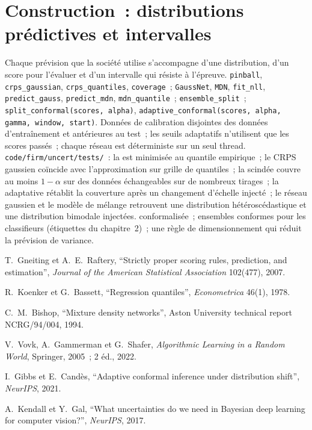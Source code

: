 \section{Construction~: distributions prédictives et intervalles}\label{bld:ml:probabilistic-models-and-uncertainty:uncert}

\begin{build}
 Chaque prévision que la société utilise s'accompagne d'une distribution, d'un score pour l'évaluer et d'un intervalle qui résiste à l'épreuve.
 \texttt{pinball}, \texttt{crps\_gaussian}, \texttt{crps\_quantiles}, \texttt{coverage}~;
\texttt{GaussNet}, \texttt{MDN}, \texttt{fit\_nll}, \texttt{predict\_gauss}, \texttt{predict\_mdn}, \texttt{mdn\_quantile}~;
\texttt{ensemble\_split}~; \texttt{split\_conformal(scores, alpha)},
\texttt{adaptive\_conformal(scores, alpha, gamma, window, start)}.
 Données de calibration disjointes des données d'entraînement et antérieures au test~; les seuils adaptatifs n'utilisent que les
scores passés~; chaque réseau est déterministe sur un seul thread.
 \texttt{code/firm/uncert/tests/}~: la  est minimisée au quantile empirique~; le
CRPS gaussien coïncide avec l'approximation sur grille de quantiles~; la  scindée couvre au moins $1 - \alpha$ sur des données échangeables
sur de nombreux tirages~; la  adaptative rétablit la couverture après un changement d'échelle injecté~; le réseau gaussien et le
modèle de mélange retrouvent une distribution hétéroscédastique et une distribution bimodale injectées.
  conformalisée~; ensembles conformes pour les classifieurs (étiquettes du chapitre~2)~; une règle de dimensionnement
qui réduit la prévision de variance.
\end{build}

\begin{omsources}
\item T.~Gneiting et A.~E.~Raftery, ``Strictly proper scoring rules, prediction, and estimation'', \emph{Journal of the
American Statistical Association} 102(477), 2007.
\item R.~Koenker et G.~Bassett, ``Regression quantiles'', \emph{Econometrica} 46(1), 1978.
\item C.~M.~Bishop, ``Mixture density networks'', Aston University technical report NCRG/94/004, 1994.
\item V.~Vovk, A.~Gammerman et G.~Shafer, \emph{Algorithmic Learning in a Random World}, Springer, 2005~; 2 éd., 2022.
\item I.~Gibbs et E.~Candès, ``Adaptive conformal inference under distribution shift'', \emph{NeurIPS}, 2021.
\item A.~Kendall et Y.~Gal, ``What uncertainties do we need in Bayesian deep learning for computer vision?'',
\emph{NeurIPS}, 2017.
\end{omsources}


